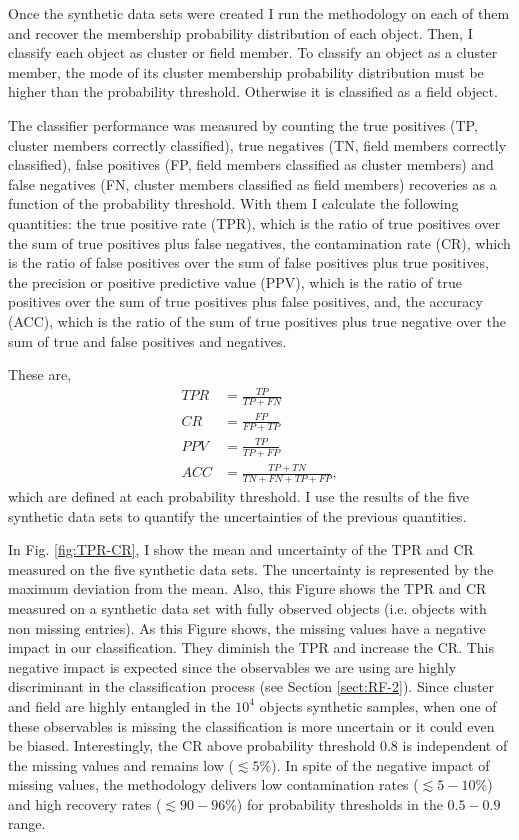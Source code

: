 Once the synthetic data sets were created I run the methodology on each of them and recover the membership probability distribution of each object. Then, I classify each object as cluster or field member. To classify an object as a cluster member, the mode of its cluster membership probability distribution must be higher than the probability threshold. Otherwise it is classified as a field object. 

The classifier performance was measured by counting the true positives (TP, cluster members correctly classified), true negatives (TN, field members correctly classified), false positives (FP, field members classified as cluster members) and false negatives (FN, cluster members classified as field members) recoveries as a function of the probability threshold. With them I calculate the following quantities: the true positive rate (TPR), which is the ratio of true positives over the sum of true positives plus false negatives, the contamination rate (CR), which is the ratio of false positives over the sum of false positives plus true positives, the precision or positive predictive value (PPV), which is the ratio of true positives over the sum of true positives plus false positives, and, the accuracy (ACC), which is the ratio of the sum of true positives plus true negative over the sum of true and false positives and negatives. 

These are,
\begin{align}
TPR &= \frac{TP}{TP+FN} \nonumber \\
CR   &= \frac{FP}{FP+TP} \nonumber \\
PPV &= \frac{TP}{TP+FP} \nonumber \\
ACC &= \frac{TP+TN}{TN+FN+TP+FP},\nonumber
\end{align}
which are defined at each probability threshold. I use the results of the five synthetic data sets to quantify the uncertainties of the previous quantities. 

In Fig. \ref{fig:TPR-CR}, I show the mean and uncertainty of the TPR and CR measured on the five synthetic data sets. The uncertainty is represented by the maximum deviation from the mean. Also, this Figure shows the TPR and CR measured on a synthetic data set with fully observed objects (i.e. objects with non missing entries). As this Figure shows, the missing values have a negative impact in our classification. They diminish the TPR  and increase the CR. This negative impact is expected since the observables we are using are highly discriminant in the classification process (see Section \ref{sect:RF-2}). Since cluster and field are highly entangled in the $10^4$ objects synthetic samples, when one of these observables is missing the classification is more uncertain or it could even be biased. Interestingly, the CR above probability threshold 0.8 is independent of the missing values and remains low ($\lesssim 5\%$). In spite of the negative impact of missing values, the methodology delivers low contamination rates ($\lesssim 5-10\%$) and high recovery rates ($\lesssim 90-96\%$) for probability thresholds in the $0.5-0.9$ range. 


